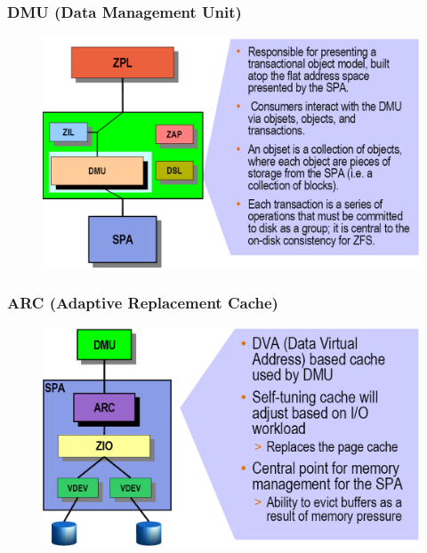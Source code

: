 % 
% 
\begin{frame}[fragile]
    \frametitle{DMU (Data Management Unit)}
    \begin{figure}
    \includegraphics[width=0.75\linewidth]{figs/ZFS-dmu.png}
    \end{figure}
\end{frame}
% 
% 
\begin{frame}[fragile]
    \frametitle{ARC (Adaptive Replacement Cache)}
    \begin{figure}
    \includegraphics[width=0.8\linewidth]{figs/ZFS-arc.png}
    \end{figure}
\end{frame}
